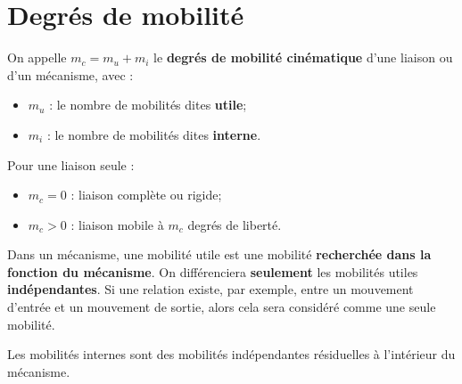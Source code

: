\documentclass[10pt,fleqn]{article} %
\begin{document}

\setlength{\columnseprule}{.1pt}

\vspace{2cm}
\pagestyle{fancy}
\thispagestyle{plain}




	\section{Degrés de mobilité}

	
		
		\begin{definition}
		On appelle $m_c=m_u+m_i$ le \textbf{degrés de mobilité cinématique} d'une liaison ou d'un mécanisme, avec :
			\begin{itemize}
				\item $m_u$ : le nombre de mobilités dites \textbf{utile};
				\item $m_i$ : le nombre de mobilités dites \textbf{interne}.
			\end{itemize}
		\end{definition}

		Pour une liaison seule :
		\begin{itemize}
			\item $m_c=0$ : liaison complète ou rigide;
			\item $m_c>0$ : liaison mobile à $m_c$ degrés de liberté.
		\end{itemize}

		\begin{rem}
			\item Dans un mécanisme, une mobilité utile est une mobilité \textbf{recherchée dans la fonction du mécanisme}.
				On différenciera \textbf{seulement} les mobilités utiles \textbf{indépendantes}.
				Si une relation existe, par exemple, entre un mouvement d'entrée et un mouvement de sortie, alors cela sera considéré comme une seule mobilité.
			\item Les mobilités internes sont des mobilités indépendantes résiduelles à l'intérieur du mécanisme.
		\end{rem}
\end{document}
